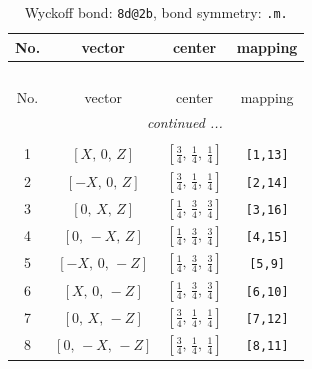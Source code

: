 \documentclass[fleqn,8pt]{jsarticle}
\begin{document}
\renewcommand{\arraystretch}{1.2}
\begin{longtable}{cccc}
\caption{Wyckoff bond: {\tt 8d@2b}, bond symmetry: {\tt .m.}}
 \\
 \hline \hline
No. & vector & center & mapping \\ \hline \endfirsthead

\multicolumn{3}{l}{\tablename\ \thetable{}} \\
 \hline \hline
No. & vector & center & mapping \\ \hline \endhead

 \hline \hline
\multicolumn{3}{r}{\footnotesize\it continued ...} \\ \endfoot

 \hline \hline
\multicolumn{3}{r}{} \\ \endlastfoot

1 & $\left[ X,\, 0,\, Z \right]$ & $\left[ \frac{3}{4},\, \frac{1}{4},\, \frac{1}{4} \right]$ & {\tt [1,13]} \\ \hline
2 & $\left[ - X,\, 0,\, Z \right]$ & $\left[ \frac{3}{4},\, \frac{1}{4},\, \frac{1}{4} \right]$ & {\tt [2,14]} \\ \hline
3 & $\left[ 0,\, X,\, Z \right]$ & $\left[ \frac{1}{4},\, \frac{3}{4},\, \frac{3}{4} \right]$ & {\tt [3,16]} \\ \hline
4 & $\left[ 0,\, - X,\, Z \right]$ & $\left[ \frac{1}{4},\, \frac{3}{4},\, \frac{3}{4} \right]$ & {\tt [4,15]} \\ \hline
5 & $\left[ - X,\, 0,\, - Z \right]$ & $\left[ \frac{1}{4},\, \frac{3}{4},\, \frac{3}{4} \right]$ & {\tt [5,9]} \\ \hline
6 & $\left[ X,\, 0,\, - Z \right]$ & $\left[ \frac{1}{4},\, \frac{3}{4},\, \frac{3}{4} \right]$ & {\tt [6,10]} \\ \hline
7 & $\left[ 0,\, X,\, - Z \right]$ & $\left[ \frac{3}{4},\, \frac{1}{4},\, \frac{1}{4} \right]$ & {\tt [7,12]} \\ \hline
8 & $\left[ 0,\, - X,\, - Z \right]$ & $\left[ \frac{3}{4},\, \frac{1}{4},\, \frac{1}{4} \right]$ & {\tt [8,11]} \\
\end{longtable}
\renewcommand{\arraystretch}{1.2}
\end{document}
